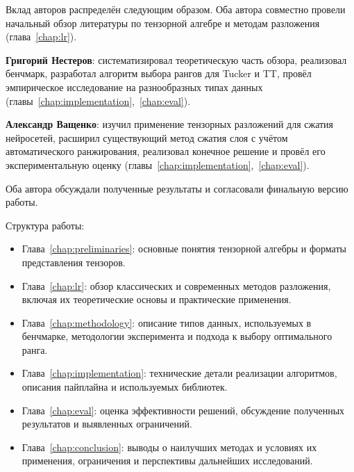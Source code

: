 Вклад авторов распределён следующим образом. Оба автора совместно провели начальный обзор литературы по тензорной алгебре и методам разложения (глава~\ref{chap:lr}). 

\textbf{Григорий Нестеров}: систематизировал теоретическую часть обзора, реализовал бенчмарк, разработал алгоритм выбора рангов для Tucker и TT, провёл эмпирическое исследование на разнообразных типах данных (главы~\ref{chap:implementation},~\ref{chap:eval}). 

\textbf{Александр Ващенко}: изучил применение тензорных разложений для сжатия нейросетей, расширил существующий метод сжатия слоя с учётом автоматического ранжирования, реализовал конечное решение и провёл его экспериментальную оценку (главы~\ref{chap:implementation},~\ref{chap:eval}).

Оба автора обсуждали полученные результаты и согласовали финальную версию работы.

Структура работы:
\begin{itemize}
  \item Глава~\ref{chap:preliminaries}: основные понятия тензорной алгебры и форматы представления тензоров.
  \item Глава~\ref{chap:lr}: обзор классических и современных методов разложения, включая их теоретические основы и практические применения.
  \item Глава~\ref{chap:methodology}: описание типов данных, используемых в бенчмарке, методологии эксперимента и подхода к выбору оптимального ранга.
  \item Глава~\ref{chap:implementation}: технические детали реализации алгоритмов, описания пайплайна и используемых библиотек.
  \item Глава~\ref{chap:eval}: оценка эффективности решений, обсуждение полученных результатов и выявленных ограничений.
  \item Глава~\ref{chap:conclusion}: выводы о наилучших методах и условиях их применения, ограничения и перспективы дальнейших исследований.
\end{itemize}
